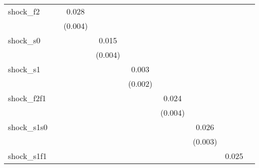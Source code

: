 {\begin{tabular}{l*{8}{c}}
\addlinespace
shock\_f2    &                     &       0.028\sym{***}&                     &                     &                     &                     &                     &                     \\
            &                     &     (0.004)         &                     &                     &                     &                     &                     &                     \\
\addlinespace
shock\_s0    &                     &                     &       0.015\sym{***}&                     &                     &                     &                     &                     \\
            &                     &                     &     (0.004)         &                     &                     &                     &                     &                     \\
\addlinespace
shock\_s1    &                     &                     &                     &       0.003         &                     &                     &                     &                     \\
            &                     &                     &                     &     (0.002)         &                     &                     &                     &                     \\
\addlinespace
shock\_f2f1  &                     &                     &                     &                     &       0.024\sym{***}&                     &                     &                     \\
            &                     &                     &                     &                     &     (0.004)         &                     &                     &                     \\
\addlinespace
shock\_s1s0  &                     &                     &                     &                     &                     &       0.026\sym{***}&                     &                     \\
            &                     &                     &                     &                     &                     &     (0.003)         &                     &                     \\
\addlinespace
shock\_s1f1  &                     &                     &                     &                     &                     &                     &       0.025\sym{***}&                     \\

\end{tabular}}
